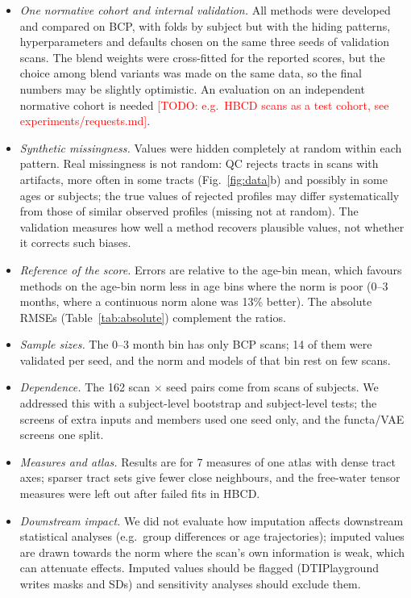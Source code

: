 \documentclass[11pt]{article}
\newcommand{\todo}[1]{\textcolor{red}{[TODO: #1]}}
\begin{document}
\begin{itemize}
\item \emph{One normative cohort and internal validation.} All methods were developed and compared on BCP, with folds by
subject but with the hiding patterns, hyperparameters and defaults chosen on the same three seeds of validation
scans. The blend weights were cross-fitted for the reported scores, but the choice among blend variants was made on the
same data, so the final numbers may be slightly optimistic. An evaluation on an independent normative cohort is
needed \todo{e.g.\ HBCD scans as a test cohort, see experiments/requests.md}.
\item \emph{Synthetic missingness.} Values were hidden completely at random within each pattern. Real missingness is
not random: QC rejects tracts in scans with artifacts, more often in some tracts (Fig.~\ref{fig:data}b) and possibly in
some ages or subjects; the true values of rejected profiles may differ systematically from those of similar observed
profiles (missing not at random). The validation measures how well a method recovers plausible values, not whether it
corrects such biases.
\item \emph{Reference of the score.} Errors are relative to the age-bin mean, which favours methods on the age-bin norm
less in age bins where the norm is poor (0--3 months, where a continuous norm alone was 13\% better). The absolute RMSEs
(Table~\ref{tab:absolute}) complement the ratios.
\item \emph{Sample sizes.} The 0--3 month bin has only \bcpbinA{} BCP scans; 14 of them were validated per seed, and the
norm and models of that bin rest on few scans.
\item \emph{Dependence.} The 162 scan $\times$ seed pairs come from \nScansDistinct{} scans of \nSubjDistinct{}
subjects. We addressed this with a subject-level bootstrap and subject-level tests; the screens of extra inputs and
members used one seed only, and the functa/VAE screens one split.
\item \emph{Measures and atlas.} Results are for 7 measures of one atlas with dense tract axes; sparser tract sets give
fewer close neighbours, and the free-water tensor measures were left out after failed fits in HBCD.
\item \emph{Downstream impact.} We did not evaluate how imputation affects downstream statistical analyses (e.g.\ group
differences or age trajectories); imputed values are drawn towards the norm where the scan's own information is weak,
which can attenuate effects. Imputed values should be flagged (DTIPlayground writes masks and SDs) and sensitivity
analyses should exclude them.
\end{itemize}
\end{document}
